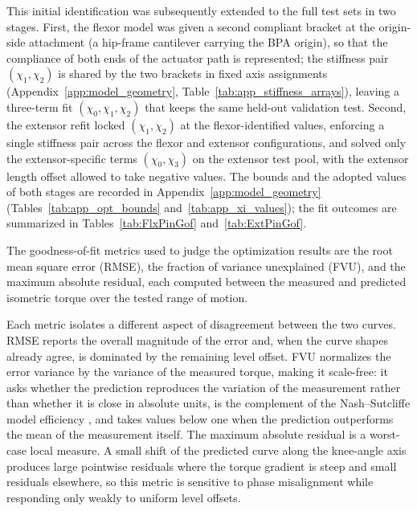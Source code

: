 This initial identification was subsequently extended to the full test sets in two stages. First, the flexor model was given a second compliant bracket at the origin-side attachment (a hip-frame cantilever carrying the BPA origin), so that the compliance of both ends of the actuator path is represented; the stiffness pair $(\chi_{1}, \chi_{2})$ is shared by the two brackets in fixed axis assignments (Appendix~\ref{app:model_geometry}, Table~\ref{tab:app_stiffness_arrays}), leaving a three-term fit $(\chi_{0}, \chi_{1}, \chi_{2})$ that keeps the same held-out validation test. Second, the extensor refit locked $(\chi_{1}, \chi_{2})$ at the flexor-identified values, enforcing a single stiffness pair across the flexor and extensor configurations, and solved only the extensor-specific terms $(\chi_{0}, \chi_{3})$ on the extensor test pool, with the extensor length offset allowed to take negative values. The bounds and the adopted values of both stages are recorded in Appendix~\ref{app:model_geometry} (Tables~\ref{tab:app_opt_bounds} and~\ref{tab:app_xi_values}); the fit outcomes are summarized in Tables~\ref{tab:FlxPinGof} and~\ref{tab:ExtPinGof}.

The goodness-of-fit metrics used to judge the optimization results are the root mean square error (RMSE), the fraction of variance unexplained (FVU), and the maximum absolute residual, each computed between the measured and predicted isometric torque over the tested range of motion.

Each metric isolates a different aspect of disagreement between the two curves. RMSE reports the overall magnitude of the error and, when the curve shapes already agree, is dominated by the remaining level offset. FVU normalizes the error variance by the variance of the measured torque, making it scale-free: it asks whether the prediction reproduces the variation of the measurement rather than whether it is close in absolute units, is the complement of the Nash--Sutcliffe model efficiency \citep{nash_river_1970}, and takes values below one when the prediction outperforms the mean of the measurement itself. The maximum absolute residual is a worst-case local measure. A small shift of the predicted curve along the knee-angle axis produces large pointwise residuals where the torque gradient is steep and small residuals elsewhere, so this metric is sensitive to phase misalignment while responding only weakly to uniform level offsets.

